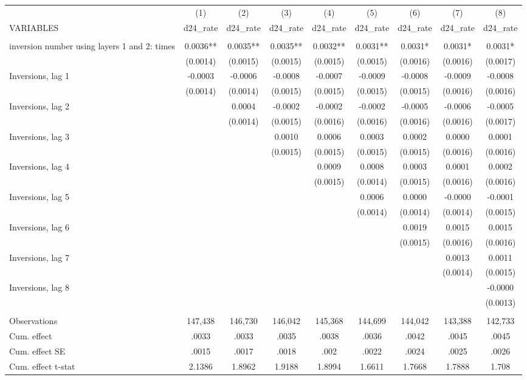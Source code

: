 \begin{tabular}{lcccccccc} \hline
 & (1) & (2) & (3) & (4) & (5) & (6) & (7) & (8) \\
VARIABLES & d24\_rate & d24\_rate & d24\_rate & d24\_rate & d24\_rate & d24\_rate & d24\_rate & d24\_rate \\ \hline
 &  &  &  &  &  &  &  &  \\
inversion number using layers 1 and 2: times & 0.0036** & 0.0035** & 0.0035** & 0.0032** & 0.0031** & 0.0031* & 0.0031* & 0.0031* \\
 & (0.0014) & (0.0015) & (0.0015) & (0.0015) & (0.0015) & (0.0016) & (0.0016) & (0.0017) \\
Inversions, lag 1 & -0.0003 & -0.0006 & -0.0008 & -0.0007 & -0.0009 & -0.0008 & -0.0009 & -0.0008 \\
 & (0.0014) & (0.0014) & (0.0015) & (0.0015) & (0.0015) & (0.0015) & (0.0016) & (0.0016) \\
Inversions, lag 2 &  & 0.0004 & -0.0002 & -0.0002 & -0.0002 & -0.0005 & -0.0006 & -0.0005 \\
 &  & (0.0014) & (0.0015) & (0.0016) & (0.0016) & (0.0016) & (0.0016) & (0.0017) \\
Inversions, lag 3 &  &  & 0.0010 & 0.0006 & 0.0003 & 0.0002 & 0.0000 & 0.0001 \\
 &  &  & (0.0015) & (0.0015) & (0.0015) & (0.0015) & (0.0016) & (0.0016) \\
Inversions, lag 4 &  &  &  & 0.0009 & 0.0008 & 0.0003 & 0.0001 & 0.0002 \\
 &  &  &  & (0.0015) & (0.0014) & (0.0015) & (0.0016) & (0.0016) \\
Inversions, lag 5 &  &  &  &  & 0.0006 & 0.0000 & -0.0000 & -0.0001 \\
 &  &  &  &  & (0.0014) & (0.0014) & (0.0014) & (0.0015) \\
Inversions, lag 6 &  &  &  &  &  & 0.0019 & 0.0015 & 0.0015 \\
 &  &  &  &  &  & (0.0015) & (0.0016) & (0.0016) \\
Inversions, lag 7 &  &  &  &  &  &  & 0.0013 & 0.0011 \\
 &  &  &  &  &  &  & (0.0014) & (0.0015) \\
Inversions, lag 8 &  &  &  &  &  &  &  & -0.0000 \\
 &  &  &  &  &  &  &  & (0.0013) \\
 &  &  &  &  &  &  &  &  \\
Observations & 147,438 & 146,730 & 146,042 & 145,368 & 144,699 & 144,042 & 143,388 & 142,733 \\
Cum. effect & .0033 & .0033 & .0035 & .0038 & .0036 & .0042 & .0045 & .0045 \\
Cum. effect SE & .0015 & .0017 & .0018 & .002 & .0022 & .0024 & .0025 & .0026 \\
 Cum. effect t-stat & 2.1386 & 1.8962 & 1.9188 & 1.8994 & 1.6611 & 1.7668 & 1.7888 & 1.708 \\ \hline
\end{tabular}
